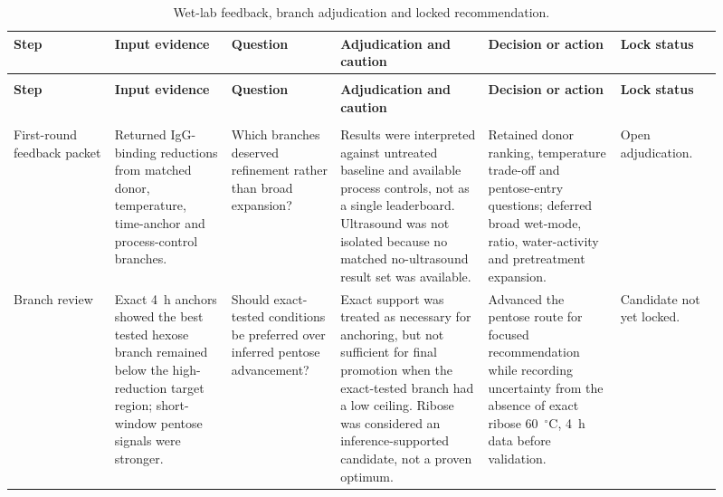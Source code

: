 \clearpage
\begingroup
\scriptsize
\setlength{\tabcolsep}{2pt}
\renewcommand{\arraystretch}{1.14}
\begin{longtable}{
  >{\raggedright\arraybackslash}p{0.13\linewidth}
  >{\raggedright\arraybackslash}p{0.15\linewidth}
  >{\raggedright\arraybackslash}p{0.14\linewidth}
  >{\raggedright\arraybackslash}p{0.19\linewidth}
  >{\raggedright\arraybackslash}p{0.17\linewidth}
  >{\raggedright\arraybackslash}p{0.13\linewidth}
}
\caption{Wet-lab feedback, branch adjudication and locked recommendation.}
\label{tab:feedback_locking}\\
\toprule
\textbf{Step} & \textbf{Input evidence} & \textbf{Question} & \textbf{Adjudication and caution} & \textbf{Decision or action} & \textbf{Lock status} \\
\midrule
\endfirsthead

\multicolumn{6}{l}{\tablename~\thetable\quad continued} \\
\toprule
\textbf{Step} & \textbf{Input evidence} & \textbf{Question} & \textbf{Adjudication and caution} & \textbf{Decision or action} & \textbf{Lock status} \\
\midrule
\endhead

\midrule
\multicolumn{6}{r}{Continued on next page} \\
\endfoot

\bottomrule
\endlastfoot

First-round feedback packet
& Returned IgG-binding reductions from matched donor, temperature, time-anchor and process-control branches.
& Which branches deserved refinement rather than broad expansion?
& Results were interpreted against untreated baseline and available process controls, not as a single leaderboard. Ultrasound was not isolated because no matched no-ultrasound result set was available.
& Retained donor ranking, temperature trade-off and pentose-entry questions; deferred broad wet-mode, ratio, water-activity and pretreatment expansion.
& Open adjudication. \\

Branch review
& Exact 4~h anchors showed the best tested hexose branch remained below the high-reduction target region; short-window pentose signals were stronger.
& Should exact-tested conditions be preferred over inferred pentose advancement?
& Exact support was treated as necessary for anchoring, but not sufficient for final promotion when the exact-tested branch had a low ceiling. Ribose was considered an inference-supported candidate, not a proven optimum.
& Advanced the pentose route for focused recommendation while recording uncertainty from the absence of exact ribose 60~$^\circ$C, 4~h data before validation.
& Candidate not yet locked. \\


\end{longtable}
